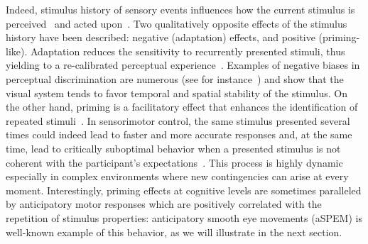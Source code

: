 \documentclass[12pt,english]{article}%
\newcommand{\citep}[1]{\parencite{#1}}
\newcommand{\citet}[1]{\textcite{#1}}
\newcommand{\AM}[1]{\textbf{\textcolor{blue}{[AM: #1]}}}
\begin{document}
Indeed, stimulus history of sensory events influences
how the current stimulus is perceived~\citep{Sotiropoulos2011,Adams12,ChopinMamassian2012,FischerWhitney2014,Cicchini_PRSB_2018} and
acted upon~\citep{WallmanFuchs1998,Carpenter1995, Maus2015,Damasse18}.
Two qualitatively opposite effects of the stimulus history have been described: 
negative (adaptation) effects, and positive (priming-like).
Adaptation reduces the sensitivity to recurrently presented stimuli,
thus yielding to a re-calibrated perceptual experience~\citep{Clifford2007, Webster2011, Kohn2007}. Examples of negative biases in perceptual discrimination are numerous (see for instance~\citet{KanaiVerstraten2005,ChopinMamassian2012}) and show that the visual system tends
to favor temporal and spatial stability of the stimulus.
On the other hand, priming is a facilitatory effect that
enhances the identification of repeated stimuli~\citep{Verstraten1994, Tiest2009}.
In sensorimotor control,
the same stimulus presented several times could indeed
lead to faster and more accurate responses and,
at the same time, lead to critically suboptimal behavior
when a presented stimulus is not coherent
with the participant's expectations~\citep{Hyman1953, Yu2009}. This process is highly dynamic especially in complex environments
where new contingencies can arise at every moment.
Interestingly, priming effects at cognitive levels
are sometimes paralleled by anticipatory motor responses which are positively correlated with the repetition of stimulus properties: anticipatory smooth eye movements (aSPEM) is well-known example of this behavior, as we will illustrate in the next section.
\end{document}
